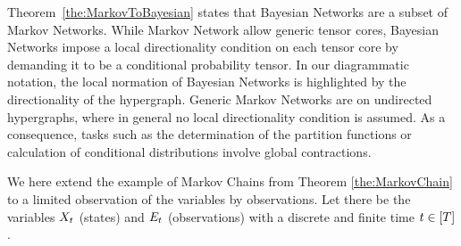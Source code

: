 
Theorem~\ref{the:MarkovToBayesian} states that Bayesian Networks are a subset of Markov Networks.
While Markov Network allow generic tensor cores, Bayesian Networks impose a local directionality condition on each tensor core by demanding it to be a conditional probability tensor.
In our diagrammatic notation, the local normation of Bayesian Networks is highlighted by the directionality of the hypergraph.
Generic Markov Networks are on undirected hypergraphs, where in general no local directionality condition is assumed.
As a consequence, tasks such as the determination of the partition functions or calculation of conditional distributions involve global contractions.





We here extend the example of Markov Chains from Theorem \ref{the:MarkovChain} to a limited observation of the variables by observations.
Let there be the variables $X_{t}$ (states) and $E_{t}$ (observations) with a discrete and finite time $t\in[T]$.

